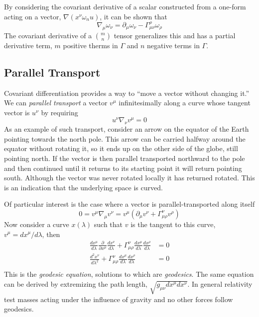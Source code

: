 By considering the covariant derivative of a scalar constructed from a
one-form acting on a vector, $\nabla (x^\nu \omega_nu)$, it can be shown
that
%
\begin{equation*}
\nabla_\mu \omega_\nu = \partial_\mu \omega_\nu - 
\Gamma^\rho_{\mu\nu} \omega_\rho
\end{equation*}
%
The covariant derivative of a ${m \choose n}$ tensor generalizes this
and has a partial derivative term, $m$ positive therms in $\Gamma$ and
$n$ negative terms in $\Gamma$.

\subsection{Parallel Transport}
\label{ssec:parallel}

Covariant differentiation provides a way to ``move a vector without
changing it.''  We can \emph{parallel transport} a vector $v^\mu$
infinitesimally along a curve whose tangent vector is $u^\nu$ by
requiring
%
\begin{equation*}
u^\nu \nabla_\nu v^\mu = 0
\end{equation*}
%
As an example of such transport, consider an arrow on the equator of
the Earth pointing towards the north pole.  This arrow can be carried
halfway around the equator without rotating it, so it ends up on the
other side of the globe, still pointing north.  If the vector is then
parallel transported northward to the pole and then continued until it
returns to its starting point it will return pointing south.  Although
the vector was never rotated locally it has returned rotated.  This is
an indication that the underlying space is curved.

Of particular interest is the case where a vector is
parallel-transported along itself
%
\begin{equation*}
0 = v^\mu \nabla_\mu v^\nu 
= v^\mu (\partial_\mu v^\nu + \Gamma^\nu_{\mu\rho} v^\rho)
\end{equation*}
%
Now consider a curve $x(\lambda)$ such that $v$ is the tangent to this
curve, $v^\mu = d x^\mu/d\lambda$, then
%
\begin{align}
\label{eq:geodesic}
\frac{d x^\mu}{d\lambda}
  \frac{\partial }{\partial x^\mu}
  \frac{d x^\nu}{d\lambda}  
+ \Gamma^\nu_{\mu\rho} 
\frac{d x^\mu}{d\lambda}
\frac{d x^\rho}{d\lambda} &= 0 \nonumber \\
\frac{d^2 x^\nu}{d\lambda^2}
+ \Gamma^\nu_{\mu\rho} 
\frac{d x^\mu}{d\lambda}
\frac{d x^\rho}{d\lambda} &= 0 \nonumber \\
\end{align}
%
This is the \emph{geodesic equation}, solutions to which are
\emph{geodesics}.  The same equation can be derived by extremizing the
path length, $\sqrt{g_{\mu\nu} dx^\mu dx^\nu}$.  In general relativity
test masses acting under the influence of gravity and no other forces
follow geodesics.  

